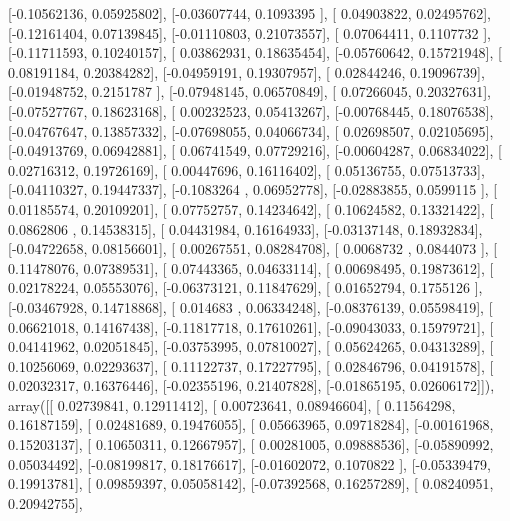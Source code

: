 \documentclass{article}
\begin{document}
       [-0.10562136,  0.05925802],
       [-0.03607744,  0.1093395 ],
       [ 0.04903822,  0.02495762],
       [-0.12161404,  0.07139845],
       [-0.01110803,  0.21073557],
       [ 0.07064411,  0.1107732 ],
       [-0.11711593,  0.10240157],
       [ 0.03862931,  0.18635454],
       [-0.05760642,  0.15721948],
       [ 0.08191184,  0.20384282],
       [-0.04959191,  0.19307957],
       [ 0.02844246,  0.19096739],
       [-0.01948752,  0.2151787 ],
       [-0.07948145,  0.06570849],
       [ 0.07266045,  0.20327631],
       [-0.07527767,  0.18623168],
       [ 0.00232523,  0.05413267],
       [-0.00768445,  0.18076538],
       [-0.04767647,  0.13857332],
       [-0.07698055,  0.04066734],
       [ 0.02698507,  0.02105695],
       [-0.04913769,  0.06942881],
       [ 0.06741549,  0.07729216],
       [-0.00604287,  0.06834022],
       [ 0.02716312,  0.19726169],
       [ 0.00447696,  0.16116402],
       [ 0.05136755,  0.07513733],
       [-0.04110327,  0.19447337],
       [-0.1083264 ,  0.06952778],
       [-0.02883855,  0.0599115 ],
       [ 0.01185574,  0.20109201],
       [ 0.07752757,  0.14234642],
       [ 0.10624582,  0.13321422],
       [ 0.0862806 ,  0.14538315],
       [ 0.04431984,  0.16164933],
       [-0.03137148,  0.18932834],
       [-0.04722658,  0.08156601],
       [ 0.00267551,  0.08284708],
       [ 0.0068732 ,  0.0844073 ],
       [ 0.11478076,  0.07389531],
       [ 0.07443365,  0.04633114],
       [ 0.00698495,  0.19873612],
       [ 0.02178224,  0.05553076],
       [-0.06373121,  0.11847629],
       [ 0.01652794,  0.1755126 ],
       [-0.03467928,  0.14718868],
       [ 0.014683  ,  0.06334248],
       [-0.08376139,  0.05598419],
       [ 0.06621018,  0.14167438],
       [-0.11817718,  0.17610261],
       [-0.09043033,  0.15979721],
       [ 0.04141962,  0.02051845],
       [-0.03753995,  0.07810027],
       [ 0.05624265,  0.04313289],
       [ 0.10256069,  0.02293637],
       [ 0.11122737,  0.17227795],
       [ 0.02846796,  0.04191578],
       [ 0.02032317,  0.16376446],
       [-0.02355196,  0.21407828],
       [-0.01865195,  0.02606172]]), array([[ 0.02739841,  0.12911412],
       [ 0.00723641,  0.08946604],
       [ 0.11564298,  0.16187159],
       [ 0.02481689,  0.19476055],
       [ 0.05663965,  0.09718284],
       [-0.00161968,  0.15203137],
       [ 0.10650311,  0.12667957],
       [ 0.00281005,  0.09888536],
       [-0.05890992,  0.05034492],
       [-0.08199817,  0.18176617],
       [-0.01602072,  0.1070822 ],
       [-0.05339479,  0.19913781],
       [ 0.09859397,  0.05058142],
       [-0.07392568,  0.16257289],
       [ 0.08240951,  0.20942755],
\end{document}
